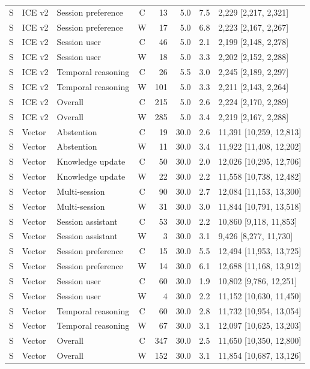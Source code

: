\documentclass[11pt,a4paper]{article}
\begin{document}
\begin{longtable}{@{}L{1.0cm}L{1.0cm}L{2.6cm}crrrL{3.6cm}@{}}
S & ICE v2 & Session preference & C & 13 & 5.0 & 7.5 & 2,229 [2,217, 2,321] \\
S & ICE v2 & Session preference & W & 17 & 5.0 & 6.8 & 2,223 [2,167, 2,267] \\
S & ICE v2 & Session user & C & 46 & 5.0 & 2.1 & 2,199 [2,148, 2,278] \\
S & ICE v2 & Session user & W & 18 & 5.0 & 3.3 & 2,202 [2,152, 2,288] \\
S & ICE v2 & Temporal reasoning & C & 26 & 5.5 & 3.0 & 2,245 [2,189, 2,297] \\
S & ICE v2 & Temporal reasoning & W & 101 & 5.0 & 3.3 & 2,211 [2,143, 2,264] \\
S & ICE v2 & Overall & C & 215 & 5.0 & 2.6 & 2,224 [2,170, 2,289] \\
S & ICE v2 & Overall & W & 285 & 5.0 & 3.4 & 2,219 [2,167, 2,288] \\
S & Vector & Abstention & C & 19 & 30.0 & 2.6 & 11,391 [10,259, 12,813] \\
S & Vector & Abstention & W & 11 & 30.0 & 3.4 & 11,922 [11,408, 12,202] \\
S & Vector & Knowledge update & C & 50 & 30.0 & 2.0 & 12,026 [10,295, 12,706] \\
S & Vector & Knowledge update & W & 22 & 30.0 & 2.2 & 11,558 [10,738, 12,482] \\
S & Vector & Multi-session & C & 90 & 30.0 & 2.7 & 12,084 [11,153, 13,300] \\
S & Vector & Multi-session & W & 31 & 30.0 & 3.0 & 11,844 [10,791, 13,518] \\
S & Vector & Session assistant & C & 53 & 30.0 & 2.2 & 10,860 [9,118, 11,853] \\
S & Vector & Session assistant & W & 3 & 30.0 & 3.1 & 9,426 [8,277, 11,730] \\
S & Vector & Session preference & C & 15 & 30.0 & 5.5 & 12,494 [11,953, 13,725] \\
S & Vector & Session preference & W & 14 & 30.0 & 6.1 & 12,688 [11,168, 13,912] \\
S & Vector & Session user & C & 60 & 30.0 & 1.9 & 10,802 [9,786, 12,251] \\
S & Vector & Session user & W & 4 & 30.0 & 2.2 & 11,152 [10,630, 11,450] \\
S & Vector & Temporal reasoning & C & 60 & 30.0 & 2.8 & 11,732 [10,954, 13,054] \\
S & Vector & Temporal reasoning & W & 67 & 30.0 & 3.1 & 12,097 [10,625, 13,203] \\
S & Vector & Overall & C & 347 & 30.0 & 2.5 & 11,650 [10,350, 12,800] \\
S & Vector & Overall & W & 152 & 30.0 & 3.1 & 11,854 [10,687, 13,126] \\
\bottomrule\end{longtable}
\normalsize
\FloatBarrier
\end{document}
